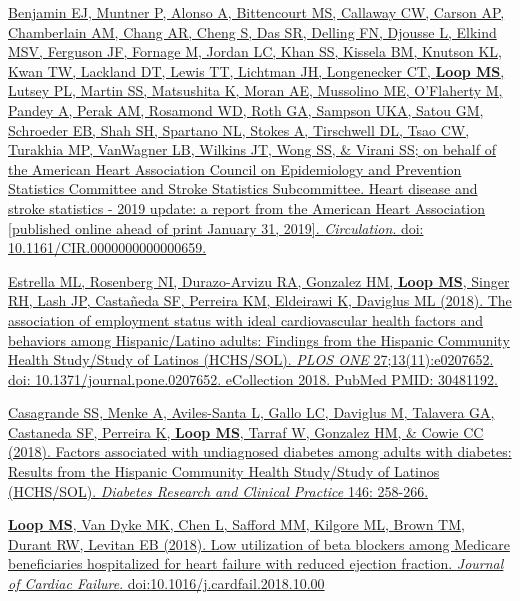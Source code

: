\documentclass[10pt,letterpaper]{article}
\begin{document}
\begin{etaremune}
\item \href{https://www.ahajournals.org/doi/abs/10.1161/CIR.0000000000000659}{Benjamin EJ, Muntner P, Alonso A, Bittencourt MS, Callaway CW, Carson AP, Chamberlain AM, Chang AR, Cheng S, Das SR, Delling FN, Djousse L, Elkind MSV, Ferguson JF, Fornage M, Jordan LC, Khan SS, Kissela BM, Knutson KL, Kwan TW, Lackland DT, Lewis TT, Lichtman JH, Longenecker CT, \textbf{Loop MS}, Lutsey PL, Martin SS, Matsushita K, Moran AE, Mussolino ME, O’Flaherty M, Pandey A, Perak AM, Rosamond WD, Roth GA, Sampson UKA, Satou GM, Schroeder EB, Shah SH, Spartano NL, Stokes A, Tirschwell DL, Tsao CW, Turakhia MP, VanWagner LB, Wilkins JT, Wong SS, \& Virani SS; on behalf of the American Heart Association Council on Epidemiology and Prevention Statistics Committee and Stroke Statistics Subcommittee. Heart disease and stroke statistics - 2019 update: a report from the American Heart Association [published online ahead of print January 31, 2019]. \emph{Circulation}. doi: 10.1161/CIR.0000000000000659.}

\item \href{https://journals.plos.org/plosone/article?id=10.1371/journal.pone.0207652}{Estrella ML, Rosenberg NI, Durazo-Arvizu RA, Gonzalez HM, \textbf{Loop MS}, Singer RH, Lash JP, Castañeda SF, Perreira KM, Eldeirawi K, Daviglus ML (2018). The association of employment status with ideal cardiovascular health factors and behaviors among Hispanic/Latino adults: Findings from the Hispanic Community Health Study/Study of Latinos (HCHS/SOL). \emph{PLOS ONE} 27;13(11):e0207652. doi: 10.1371/journal.pone.0207652. eCollection 2018. PubMed PMID: 30481192.}

\item \href{https://www.sciencedirect.com/science/article/pii/S0168822718308866}{Casagrande SS, Menke A, Aviles-Santa L, Gallo LC, Daviglus M, Talavera GA, Castaneda SF, Perreira K, \textbf{Loop MS}, Tarraf W, Gonzalez HM, \& Cowie CC (2018). Factors associated with undiagnosed diabetes among adults with diabetes: Results from the Hispanic Community Health Study/Study of Latinos (HCHS/SOL). \emph{Diabetes Research and Clinical Practice} 146: 258-266.}

\item  \href{https://www.sciencedirect.com/science/article/abs/pii/S1071916418311072}{\textbf{Loop MS}, Van Dyke MK, Chen L, Safford MM, Kilgore ML, Brown TM, Durant RW, Levitan EB (2018). Low utilization of beta blockers among Medicare beneficiaries hospitalized for heart failure with reduced ejection fraction. \emph{Journal of Cardiac
Failure}. doi:10.1016/j.cardfail.2018.10.00}


\end{etaremune}
\end{document}
